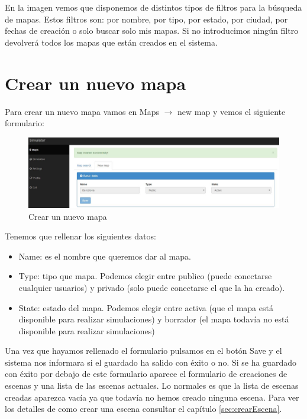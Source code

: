 En la imagen vemos que disponemos de distintos tipos de filtros para la búsqueda de mapas. Estos filtros son: por nombre, por tipo, por estado, por ciudad, por fechas de creación o solo buscar solo mis mapas. Si no introducimos ningún filtro devolverá todos los mapas que están creados en el sistema.

\section{Crear un nuevo mapa}\label{sec:crearMapa}

Para crear un nuevo mapa vamos en Maps $\rightarrow$ new map y vemos el siguiente formulario:

\begin{figure}[H]
	\centering\includegraphics[scale=0.25]{imagenes/capitulo8/crear-un-nuevo-mapa.jpg}
	\caption{Crear un nuevo mapa}
	\label{img:AddMapa}
\end{figure}

Tenemos que rellenar los siguientes datos:

\begin{itemize}
	\item Name: es el nombre que queremos dar al mapa.
	\item Type: tipo que mapa. Podemos elegir entre publico (puede conectarse cualquier usuarios) y privado (solo puede conectarse el que la ha creado).
	\item State: estado del mapa. Podemos elegir entre activa (que el mapa está disponible para realizar simulaciones) y borrador (el mapa todavía no está disponible para realizar simulaciones)
\end{itemize}

Una vez que hayamos rellenado el formulario pulsamos en el botón Save y el sistema nos informara si el guardado ha salido con éxito o no. Si se ha guardado con éxito por debajo de este formulario aparece el formulario de creaciones de escenas y una lista de las escenas actuales. Lo normales es que la lista de escenas creadas aparezca vacía ya que todavía no hemos creado ninguna escena. Para ver los detalles de como crear una escena consultar el capítulo \ref{sec:crearEscena}.

